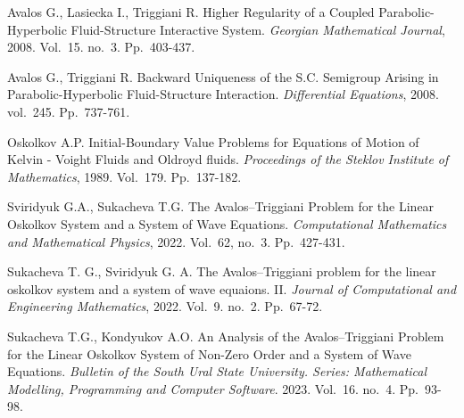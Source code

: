\documentclass[12pt]{llncs}
\begin{document}
\begin{thebibliography}{9} %






Avalos G., Lasiecka I., Triggiani R. Higher Regularity of a Coupled Parabolic-Hyperbolic Fluid-Structure Interactive System. \textit{Georgian Mathematical Journal}, 2008.
Vol.~15. no.~3. Pp.~403-437.

Avalos G., Triggiani R. Backward Uniqueness of the S.C. Semigroup Arising
in Parabolic-Hyperbolic Fluid-Structure Interaction. \textit{Differential Equations}, 2008.
vol.~245. Pp.~737-761.

Oskolkov A.P. Initial-Boundary Value Problems for Equations of Motion of Kelvin -
Voight Fluids and Oldroyd fluids. \textit{Proceedings of the Steklov Institute of Mathematics},
1989. Vol.~179. Pp.~137-182.

Sviridyuk G.A., Sukacheva T.G. The Avalos--Triggiani Problem for the Linear
Oskolkov System and a System of Wave Equations.  \textit{Computational Mathematics
and Mathematical Physics}, 2022. Vol.~62, no.~3. Pp.~427-431.

Sukacheva T. G.,  Sviridyuk G. A. The Avalos--Triggiani problem for the linear oskolkov system and a system of wave equaions. II. \textit{Journal of Computational and Engineering Mathematics}, 2022. Vol.~9. no.~2. Pp.~67-72.

Sukacheva T.G., Kondyukov  A.O. An Analysis of the Avalos--Triggiani Problem for the Linear Oskolkov System of Non-Zero Order and a System of Wave Equations. \textit{Bulletin of the South Ural State University. Series: Mathematical Modelling,
Programming and Computer Software}. 2023. Vol.~16. no.~4.  Pp.~93-98.

\end{thebibliography}
\end{document}
